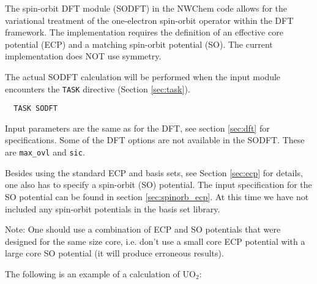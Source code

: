 \label{sec:sodft}


The spin-orbit DFT module (SODFT) in the NWChem code allows for the variational treatment
of the one-electron spin-orbit operator within the DFT framework. The implementation 
requires the definition of an effective core potential (ECP) and a matching spin-orbit
potential (SO). The current implementation does NOT use symmetry. 

The actual SODFT calculation will be performed when the input module
encounters the \verb+TASK+ directive (Section \ref{sec:task}).  

\begin{verbatim}
  TASK SODFT
\end{verbatim}

Input parameters are the same as for the DFT, see section \ref{sec:dft} for specifications. 
Some of the DFT options are not available in the SODFT. These are \verb+max_ovl+ and 
\verb+sic+.

Besides using the standard ECP and basis sets, see Section \ref{sec:ecp} for details, one 
also has to specify a spin-orbit (SO) potential. The input specification for the SO potential
can be found in section \ref{sec:spinorb_ecp}. At this time we have not included any spin-orbit
potentials in the basis set library.

Note: One should use a combination of ECP and SO potentials that were designed for the same 
size core, i.e. don't use a small core ECP potential with a large core SO potential (it will
produce erroneous results).

The following is an example of a calculation of $\mathrm{UO_2}$:

